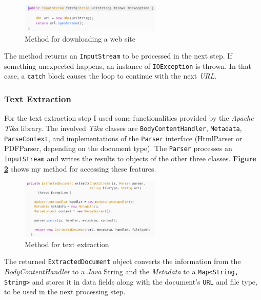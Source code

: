 \documentclass[a4paper]{usiinfbachelorproject}
\begin{document}
\begin{figure}[h!]
\centering
\includegraphics[width=0.6\textwidth]{figures/downloadMethod}
\caption{Method for downloading a web site}
\label{fig:downloadMethod}
\end{figure}

The method returns an \texttt{InputStream} to be processed in the next step. If something unexpected happens, an instance
 of \texttt{IOException} is thrown. In that case, a \texttt{catch} block causes the loop to continue with
the next \emph{URL}. 

\subsubsection{Text Extraction}

For the text extraction step I used some functionalities provided by the \emph{Apache Tika} \cite{tikaHome} library.
The involved \emph{Tika} classes are \texttt{BodyContentHandler}, \texttt{Metadata}, \texttt{ParseContext}, and implementations of the
\texttt{Parser} interface (HtmlParser or PDFParser, depending on the document type). The \texttt{Parser} processes
an \texttt{InputStream} and writes the results to objects of the other three classes. 
\textbf{Figure \ref{fig:extractionMethod}} shows my method for accessing these features.

\begin{figure}[h!]
\centering
\includegraphics[width=0.6\textwidth]{figures/extractionMethod}
\caption{Method for text extraction}
\label{fig:extractionMethod}
\end{figure}

The returned \texttt{ExtractedDocument} object converts the information from the \emph{BodyContentHandler} to a \emph{Java}
String and the \emph{Metadata} to a \texttt{Map<String, String>} and stores it in data fields along with the document's \texttt{URL}
and file type, to be used in the next processing step. 
\end{document}
